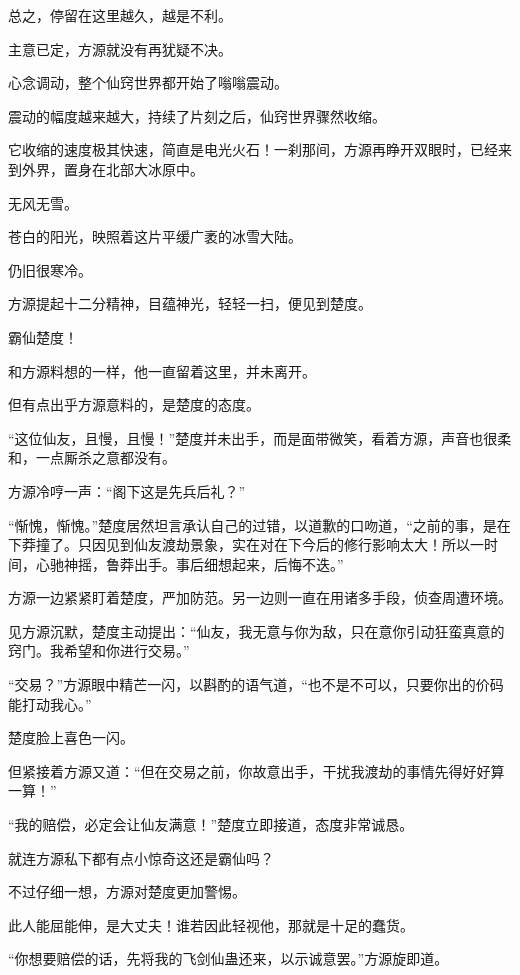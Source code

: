 \begin{this_body}
总之，停留在这里越久，越是不利。

主意已定，方源就没有再犹疑不决。

心念调动，整个仙窍世界都开始了嗡嗡震动。

震动的幅度越来越大，持续了片刻之后，仙窍世界骤然收缩。

它收缩的速度极其快速，简直是电光火石！一刹那间，方源再睁开双眼时，已经来到外界，置身在北部大冰原中。

无风无雪。

苍白的阳光，映照着这片平缓广袤的冰雪大陆。

仍旧很寒冷。

方源提起十二分精神，目蕴神光，轻轻一扫，便见到楚度。

霸仙楚度！

和方源料想的一样，他一直留着这里，并未离开。

但有点出乎方源意料的，是楚度的态度。

“这位仙友，且慢，且慢！”楚度并未出手，而是面带微笑，看着方源，声音也很柔和，一点厮杀之意都没有。

方源冷哼一声：“阁下这是先兵后礼？”

“惭愧，惭愧。”楚度居然坦言承认自己的过错，以道歉的口吻道，“之前的事，是在下莽撞了。只因见到仙友渡劫景象，实在对在下今后的修行影响太大！所以一时间，心驰神摇，鲁莽出手。事后细想起来，后悔不迭。”

方源一边紧紧盯着楚度，严加防范。另一边则一直在用诸多手段，侦查周遭环境。

见方源沉默，楚度主动提出：“仙友，我无意与你为敌，只在意你引动狂蛮真意的窍门。我希望和你进行交易。”

“交易？”方源眼中精芒一闪，以斟酌的语气道，“也不是不可以，只要你出的价码能打动我心。”

楚度脸上喜色一闪。

但紧接着方源又道：“但在交易之前，你故意出手，干扰我渡劫的事情先得好好算一算！”

“我的赔偿，必定会让仙友满意！”楚度立即接道，态度非常诚恳。

就连方源私下都有点小惊奇这还是霸仙吗？

不过仔细一想，方源对楚度更加警惕。

此人能屈能伸，是大丈夫！谁若因此轻视他，那就是十足的蠢货。

“你想要赔偿的话，先将我的飞剑仙蛊还来，以示诚意罢。”方源旋即道。

\end{this_body}

